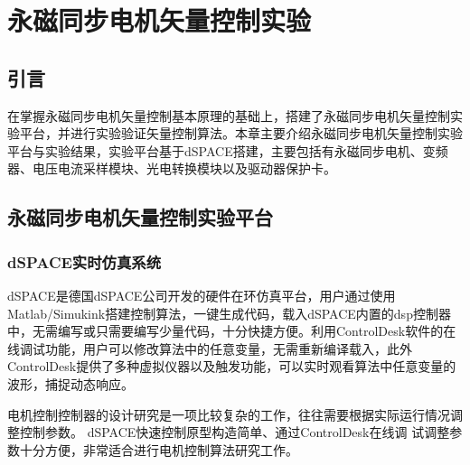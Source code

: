\chapter{永磁同步电机矢量控制实验}
\section{引言}
在掌握永磁同步电机矢量控制基本原理的基础上，搭建了永磁同步电机矢量控制实验平台，并进行实验验证矢量控制算法。本章主要介绍永磁同步电机矢量控制实验平台与实验结果，实验平台基于dSPACE搭建，主要包括有永磁同步电机、变频器、电压电流采样模块、光电转换模块以及驱动器保护卡。
\section{永磁同步电机矢量控制实验平台}

\subsection{dSPACE实时仿真系统}
dSPACE是德国dSPACE公司开发的硬件在环仿真平台，用户通过使用Matlab/Simukink搭建控制算法，一键生成代码，载入dSPACE内置的dsp控制器中，无需编写或只需要编写少量代码，十分快捷方便。利用ControlDesk软件的在线调试功能，用户可以修改算法中的任意变量，无需重新编译载入，此外ControlDesk提供了多种虚拟仪器以及触发功能，可以实时观看算法中任意变量的波形，捕捉动态响应。

电机控制控制器的设计研究是一项比较复杂的工作，往往需要根据实际运行情况调整控制参数。 dSPACE快速控制原型构造简单、通过ControlDesk在线调
试调整参数十分方便，非常适合进行电机控制算法研究工作\cite{_dspacesvpwm_2015,_dspace_2011}。
